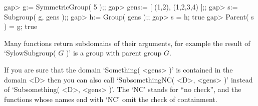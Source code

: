 \beginexample
gap> g:= SymmetricGroup( 5 );;
gap> gens:= [ (1,2), (1,2,3,4) ];;
gap> s:= Subgroup( g, gens );;
gap> h:= Group( gens );;
gap> s = h;
true
gap> Parent( s ) = g;
true
\endexample

Many functions return subdomains of their arguments, for example
the result of `SylowSubgroup( $G$ )' is a group with parent group $G$.

If you are sure that the domain `Something( <gens> )' is contained in the
domain <D> then you can also call `SubsomethingNC( <D>, <gens> )' instead
of `Subsomething( <D>, <gens> )'.
The `NC' stands for ``no check'', and the functions whose names end with
`NC' omit the check of containment.



